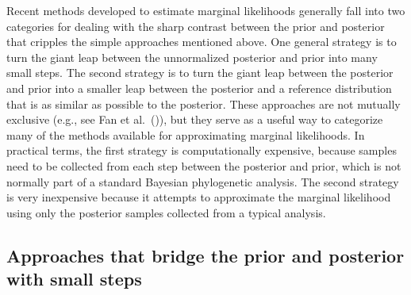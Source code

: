 Recent methods developed to estimate marginal likelihoods generally fall into
two categories for dealing with the sharp contrast between the prior and
posterior that cripples the simple approaches mentioned above.
One general strategy is to turn the giant leap between the unnormalized
posterior and prior into many small steps.
The second strategy is to turn the giant leap between the posterior and prior
into a smaller leap between the posterior and a reference distribution that is
as similar as possible to the posterior.
These approaches are not mutually exclusive (e.g., see Fan et al.\
(\citeyear{Fan2011})), but they serve as a useful way to categorize many of the
methods available for approximating marginal likelihoods.
In practical terms, the first strategy is computationally expensive, because
samples need to be collected from each step between the posterior and prior,
which is not normally part of a standard Bayesian phylogenetic analysis.
The second strategy is very inexpensive because it attempts to approximate the
marginal likelihood using only the posterior samples collected from a
typical analysis.

\subsection{Approaches that bridge the prior and posterior with small steps}

